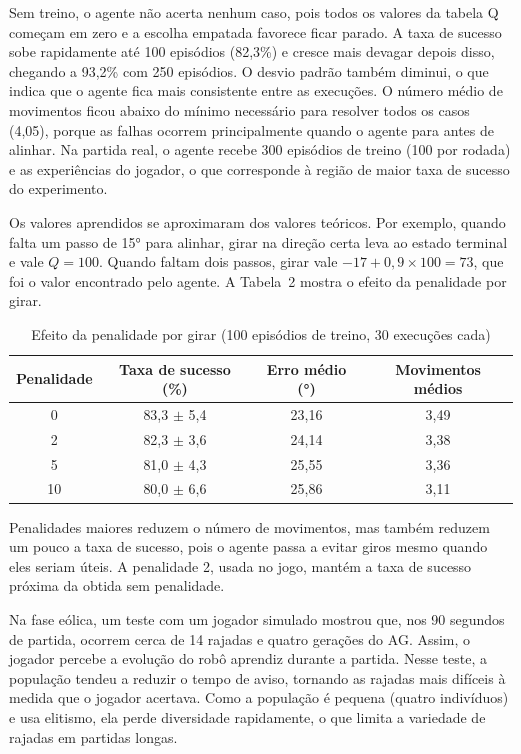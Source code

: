 \documentclass[12pt,a4paper]{article}
\newcommand{\fonte}[1]{\par\vspace{2pt}{\small Fonte: #1}}
\begin{document}
Sem treino, o agente não acerta nenhum caso, pois todos os valores da tabela Q começam em zero e a escolha empatada favorece ficar parado. A taxa de sucesso sobe rapidamente até 100 episódios (82,3\%) e cresce mais devagar depois disso, chegando a 93,2\% com 250 episódios. O desvio padrão também diminui, o que indica que o agente fica mais consistente entre as execuções. O número médio de movimentos ficou abaixo do mínimo necessário para resolver todos os casos (4,05), porque as falhas ocorrem principalmente quando o agente para antes de alinhar. Na partida real, o agente recebe 300 episódios de treino (100 por rodada) e as experiências do jogador, o que corresponde à região de maior taxa de sucesso do experimento.

Os valores aprendidos se aproximaram dos valores teóricos. Por exemplo, quando falta um passo de 15° para alinhar, girar na direção certa leva ao estado terminal e vale $Q = 100$. Quando faltam dois passos, girar vale $-17 + 0{,}9 \times 100 = 73$, que foi o valor encontrado pelo agente. A Tabela~2 mostra o efeito da penalidade por girar.

\begin{table}[H]
\centering
\caption{Efeito da penalidade por girar (100 episódios de treino, 30 execuções cada)}
\begin{tabular}{cccc}
\toprule
Penalidade & Taxa de sucesso (\%) & Erro médio (°) & Movimentos médios \\
\midrule
0  & 83,3 $\pm$ 5,4 & 23,16 & 3,49 \\
2  & 82,3 $\pm$ 3,6 & 24,14 & 3,38 \\
5  & 81,0 $\pm$ 4,3 & 25,55 & 3,36 \\
10 & 80,0 $\pm$ 6,6 & 25,86 & 3,11 \\
\bottomrule
\end{tabular}
\fonte{Autoria própria (2026)}
\end{table}

Penalidades maiores reduzem o número de movimentos, mas também reduzem um pouco a taxa de sucesso, pois o agente passa a evitar giros mesmo quando eles seriam úteis. A penalidade 2, usada no jogo, mantém a taxa de sucesso próxima da obtida sem penalidade.

Na fase eólica, um teste com um jogador simulado mostrou que, nos 90 segundos de partida, ocorrem cerca de 14 rajadas e quatro gerações do AG. Assim, o jogador percebe a evolução do robô aprendiz durante a partida. Nesse teste, a população tendeu a reduzir o tempo de aviso, tornando as rajadas mais difíceis à medida que o jogador acertava. Como a população é pequena (quatro indivíduos) e usa elitismo, ela perde diversidade rapidamente, o que limita a variedade de rajadas em partidas longas.
\end{document}
